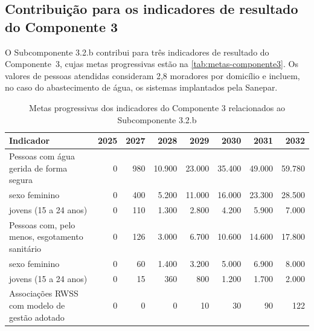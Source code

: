 
\subsection{Contribuição para os indicadores de resultado do Componente 3}

O Subcomponente 3.2.b contribui para três indicadores de resultado do
Componente~3, cujas metas progressivas estão na
\autoref{tab:metas-componente3}. Os valores de pessoas atendidas consideram
2,8 moradores por domicílio \cite{ibge2022} e incluem, no caso do
abastecimento de água, os sistemas implantados pela Sanepar.

\begin{table}[htbp]
\centering
\caption{Metas progressivas dos indicadores do Componente 3 relacionados ao Subcomponente 3.2.b}
\label{tab:metas-componente3}
\footnotesize
\renewcommand{\arraystretch}{1.2}
\begin{tabular}{lrrrrrrr}
\toprule
\textbf{Indicador} & \textbf{2025} & \textbf{2027} & \textbf{2028} &
\textbf{2029} & \textbf{2030} & \textbf{2031} & \textbf{2032} \\
\midrule
Pessoas com água gerida de forma segura & 0 & 980 & 10.900 & 23.000 & 35.400 & 49.000 & 59.780 \\
\quad sexo feminino & 0 & 400 & 5.200 & 11.000 & 16.000 & 23.300 & 28.500 \\
\quad jovens (15 a 24 anos) & 0 & 110 & 1.300 & 2.800 & 4.200 & 5.900 & 7.000 \\
Pessoas com, pelo menos, esgotamento sanitário & 0 & 126 & 3.000 & 6.700 & 10.600 & 14.600 & 17.800 \\
\quad sexo feminino & 0 & 60 & 1.400 & 3.200 & 5.000 & 6.900 & 8.000 \\
\quad jovens (15 a 24 anos) & 0 & 15 & 360 & 800 & 1.200 & 1.700 & 2.000 \\
Associações RWSS com modelo de gestão adotado & 0 & 0 & 0 & 10 & 30 & 90 & 122 \\
\bottomrule
\end{tabular}
\end{table}

